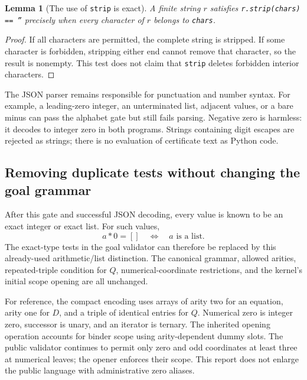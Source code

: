 \documentclass[11pt,a4paper]{article}
\newtheorem{lemma}[theorem]{Lemma}
\theoremstyle{definition}\newtheorem{definition}[theorem]{Definition}
\begin{document}
\begin{lemma}[The use of \texttt{strip} is exact]
A finite string $r$ satisfies \texttt{r.strip(chars) == ''} precisely
when every character of $r$ belongs to \texttt{chars}.
\end{lemma}
\begin{proof}
If all characters are permitted, the complete string is stripped. If
some character is forbidden, stripping either end cannot remove that
character, so the result is nonempty. This test does not claim that
\texttt{strip} deletes forbidden interior characters.
\end{proof}

The JSON parser remains responsible for punctuation and number syntax.
For example, a leading-zero integer, an unterminated list, adjacent
values, or a bare minus can pass the alphabet gate but still fails
parsing. Negative zero is harmless: it decodes to integer zero in both
programs. Strings containing digit escapes are rejected as strings; there
is no evaluation of certificate text as Python code.

\subsection{Removing duplicate tests without changing the goal grammar}

After this gate and successful JSON decoding, every value is known to be
an exact integer or exact list. For such values,
\[
              a*0=[]\quad\Longleftrightarrow\quad
              a\text{ is a list}.
\]
The exact-type tests in the goal validator can therefore be replaced by
this already-used arithmetic/list distinction. The canonical grammar,
allowed arities, repeated-triple condition for $Q$, numerical-coordinate
restrictions, and the kernel's initial scope opening are all unchanged.

For reference, the compact encoding uses arrays of arity two for an
equation, arity one for $D$, and a triple of identical entries for $Q$.
Numerical zero is integer zero, successor is unary, and an iterator is
ternary. The inherited opening operation accounts for binder scope using
arity-dependent dummy slots. The public validator continues to permit
only zero and odd coordinates at least three at numerical leaves;
the opener enforces their scope. This report does not enlarge the public
language with administrative zero aliases.
\end{document}
